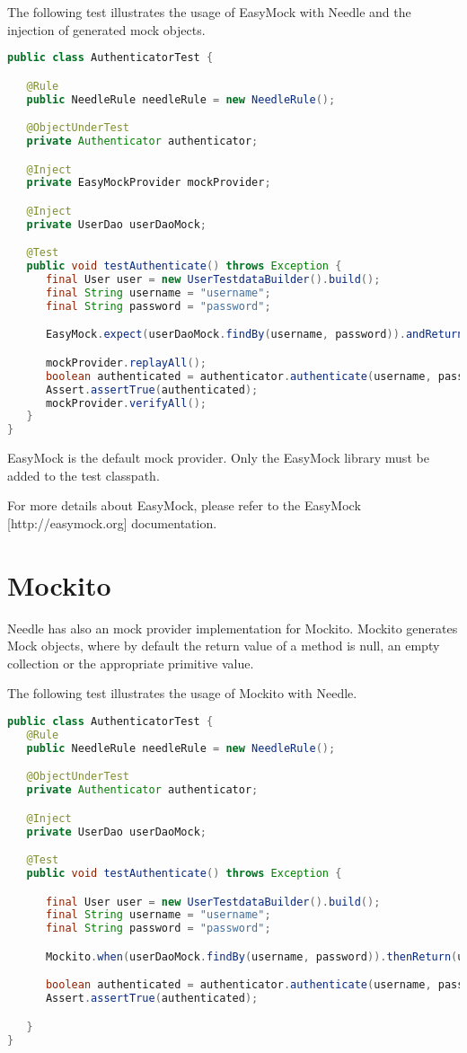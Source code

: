 The following test illustrates the usage of EasyMock with Needle and the injection of generated mock objects.

\begin{lstlisting}[language={JAVA},caption=Testing with EasyMock]
public class AuthenticatorTest {

   @Rule
   public NeedleRule needleRule = new NeedleRule();

   @ObjectUnderTest
   private Authenticator authenticator;

   @Inject
   private EasyMockProvider mockProvider;

   @Inject
   private UserDao userDaoMock;

   @Test
   public void testAuthenticate() throws Exception {
      final User user = new UserTestdataBuilder().build();
      final String username = "username";
      final String password = "password";

      EasyMock.expect(userDaoMock.findBy(username, password)).andReturn(user);

      mockProvider.replayAll();
      boolean authenticated = authenticator.authenticate(username, password);
      Assert.assertTrue(authenticated);
      mockProvider.verifyAll();
   }
}
\end{lstlisting}

EasyMock is the default mock provider. Only the EasyMock library must be added to the test classpath.

For more details about EasyMock, please refer to the EasyMock [http://easymock.org] documentation.

\section{Mockito}

Needle has also an mock provider implementation for Mockito.
Mockito generates Mock objects, where by default the return value of a method is null, an empty collection or the appropriate primitive value.

The following test illustrates the usage of Mockito with Needle.

\begin{lstlisting}[language={JAVA},caption=Testing with Mockito]
public class AuthenticatorTest {
   @Rule
   public NeedleRule needleRule = new NeedleRule();

   @ObjectUnderTest
   private Authenticator authenticator;

   @Inject
   private UserDao userDaoMock;

   @Test
   public void testAuthenticate() throws Exception {

      final User user = new UserTestdataBuilder().build();
      final String username = "username";
      final String password = "password";

      Mockito.when(userDaoMock.findBy(username, password)).thenReturn(user);

      boolean authenticated = authenticator.authenticate(username, password);
      Assert.assertTrue(authenticated);

   }
}

\end{lstlisting}

